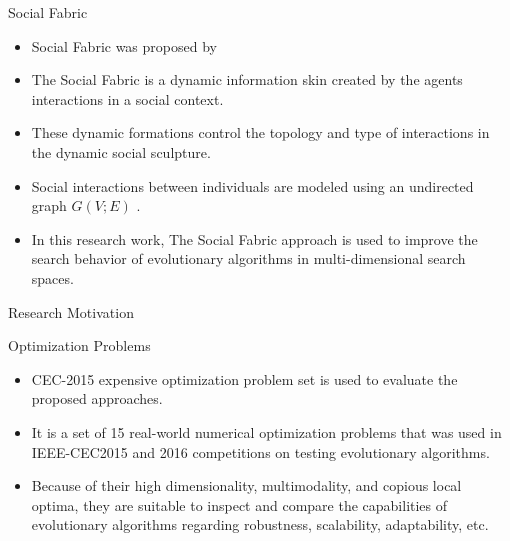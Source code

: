 \documentclass[table]{beamer}
\begin{document}
\begin{frame}{Social Fabric}
	\begin{block}{}
		\begin{itemize}
			\justifying
			\item Social Fabric was proposed by \cite{R:1}
			\item The Social Fabric is a dynamic information skin created by the agents interactions in a social context.
			\item These dynamic formations control the topology and type of interactions in the dynamic social sculpture. \cite{reynolds2008computing}
			\item Social interactions between individuals are modeled using an undirected graph $G(V;E)$ \cite{sterling2004aggregation}.
			\item In this research work, The Social Fabric approach is used to improve the search behavior of evolutionary algorithms in multi-dimensional search spaces.
		\end{itemize}
	\end{block}
\end{frame}
	
	\begin{frame}{Research Motivation}
		\begin{block}{Optimization Problems}
			\begin{itemize}
				\justifying
				\item CEC-2015 expensive optimization problem set is used to evaluate the proposed approaches. \cite{chen2014problem}
				\item It is a set of 15 real-world numerical optimization problems that was used in IEEE-CEC2015 and 2016 competitions on testing evolutionary algorithms.
				\item Because of their high dimensionality, multimodality, and copious local optima, they are suitable to inspect and compare the capabilities of evolutionary algorithms regarding robustness, scalability, adaptability, etc.
			\end{itemize}
		\end{block}
	\end{frame}
	
\end{document}
